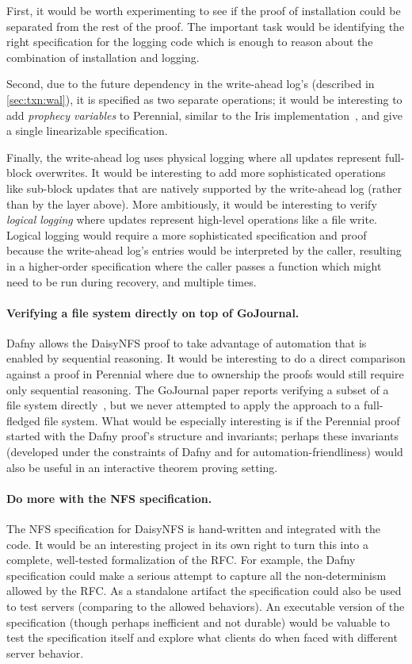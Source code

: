 First, it would be worth experimenting to see if the proof of installation could
be separated from the rest of the proof. The important task would be identifying
the right specification for the logging code which is enough to reason about the
combination of installation and logging.

Second, due to the future dependency in the write-ahead log's 
(described in \cref{sec:txn:wal}), it is specified as two separate
operations; it would be interesting to add \emph{prophecy variables} to
Perennial, similar to the Iris implementation~\cite{jung:prophecy}, and give
 a single linearizable specification.

Finally, the write-ahead log uses physical logging where all updates represent
full-block overwrites. It would be interesting to add more sophisticated
operations like sub-block updates that are natively supported by the write-ahead
log (rather than by the layer above). More ambitiously, it would be interesting
to verify \emph{logical logging} where updates represent high-level operations
like a file write. Logical logging would require a more sophisticated
specification and proof because the write-ahead log's entries would be
interpreted by the caller, resulting in a higher-order specification where the
caller passes a function which might need to be run during recovery, and
multiple times.

\paragraph{Verifying a file system directly on top of GoJournal.} Dafny allows
the DaisyNFS proof to take advantage of automation that is enabled by sequential
reasoning. It would be interesting to do a direct comparison against a proof in
Perennial where due to ownership the proofs would still require only sequential
reasoning. The GoJournal paper reports verifying a subset of a file system
directly~\cite{chajed:gojournal}, but we never attempted to apply the approach
to a full-fledged file system. What would be especially interesting is if the
Perennial proof started with the Dafny proof's structure and invariants; perhaps
these invariants (developed under the constraints of Dafny and for
automation-friendliness) would also be useful in an interactive theorem proving
setting.

\paragraph{Do more with the NFS specification.} The NFS specification for
DaisyNFS is hand-written and integrated with the code. It would be an
interesting project in its own right to turn this into a complete, well-tested
formalization of the RFC. For example, the Dafny specification could make a serious
attempt to capture all the non-determinism allowed by the RFC. As a standalone
artifact the specification could also be used to test servers (comparing to the
allowed behaviors). An executable version of the specification (though perhaps
inefficient and not durable) would be valuable to test the specification itself
and explore what clients do when faced with different server behavior.
